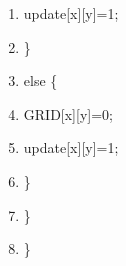 \documentclass[10pt]{article}
\begin{document}
\begin{shadebox}
\begin{enumerate}
\item \hspace{10pt} \hspace{10pt} \hspace{10pt}                         update[x][y]=1;
\item \hspace{10pt} \hspace{10pt}                 \} 
\item \hspace{10pt} \hspace{10pt}                 else \{
\item \hspace{10pt} \hspace{10pt} \hspace{10pt}                         GRID[x][y]=0;
\item \hspace{10pt} \hspace{10pt} \hspace{10pt}                         update[x][y]=1;
\item \hspace{10pt} \hspace{10pt}                 \}
\item \hspace{10pt}         \}
\item \}
\end{enumerate}
\end{shadebox}
\end{document}
